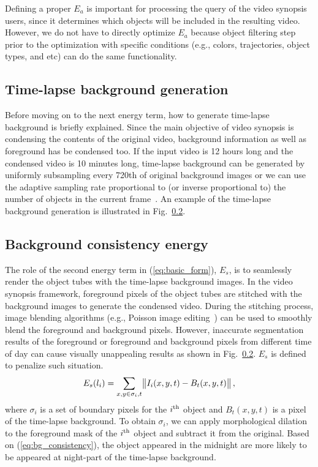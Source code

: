 \documentclass[11pt]{hyu_thesis}
\begin{document}
Defining a proper $E_a$ is important for processing the query of the video synopsis users, since it determines which objects will be included in the resulting video. However, we do not have to directly optimize $E_a$ because object filtering step prior to the optimization with specific conditions (e.g., colors, trajectories, object types, and etc) can do the same functionality.

\subsection{Time-lapse background generation}
Before moving on to the next energy term, how to generate time-lapse background is briefly explained. Since the main objective of video synopsis is condensing the contents of the original video, background information as well as foreground has be condensed too. If the input video is 12 hours long and the condensed video is 10 minutes long, time-lapse background can be generated by uniformly subsampling every 720th of original background images or we can use the adaptive sampling rate proportional to (or inverse proportional to) the number of objects in the current frame~\cite{}. An example of the time-lapse background generation is illustrated in Fig.~\ref{}.

\subsection{Background consistency energy}
The role of the second energy term in (\ref{eq:basic_form}), $E_s$, is to seamlessly render the object tubes with the time-lapse background images. In the video synopsis framework, foreground pixels of the object tubes are stitched with the background images to generate the condensed video. During the stitching process, image blending algorithms (e.g., Poisson image editing~\cite{}) can be used to smoothly blend the foreground and background pixels. However, inaccurate segmentation results of the foreground or foreground and background pixels from different time of day can cause visually unappealing results as shown in Fig.~\ref{}. $E_s$ is defined to penalize such situation.
\begin{equation}
\label{eq:bg_consistency}
E_s(l_i)=\sum_{x,y \in \sigma_i,t}\norm{I_i(x,y,t)-B_t(x,y,t)},
\end{equation}
where $\sigma_i$ is a set of boundary pixels for the $i^{\rm{th}}$ object and $B_t(x,y,t)$ is a pixel of the time-lapse background. To obtain $\sigma_i$, we can apply morphological dilation to the foreground mask of the $i^{\rm{th}}$ object and subtract it from the original. Based on (\ref{eq:bg_consistency}), the object appeared in the midnight are more likely to be appeared at night-part of the time-lapse background.
\end{document}
